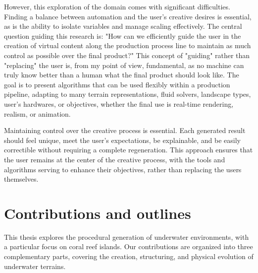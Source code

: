 However, this exploration of the domain comes with significant difficulties. Finding a balance between automation and the user's creative desires is essential, as is the ability to isolate variables and manage scaling effectively. 
The central question guiding this research is: "How can we efficiently guide the user in the creation of virtual content along the production process line to maintain as much control as possible over the final product?" This concept of "guiding" rather than "replacing" the user is, from my point of view, fundamental, as no machine can truly know better than a human what the final product should look like. The goal is to present algorithms that can be used flexibly within a production pipeline, adapting to many terrain representations, fluid solvers, landscape types, user's hardwares, or objectives, whether the final use is real-time rendering, realism, or animation.

Maintaining control over the creative process is essential. Each generated result should feel unique, meet the user's expectations, be explainable, and be easily correctible without requiring a complete regeneration. This approach ensures that the user remains at the center of the creative process, with the tools and algorithms serving to enhance their objectives, rather than replacing the users themselves.

\section{Contributions and outlines}
This thesis explores the procedural generation of underwater environments, with a particular focus on coral reef islands. Our contributions are organized into three complementary parts, covering the creation, structuring, and physical evolution of underwater terrains.


